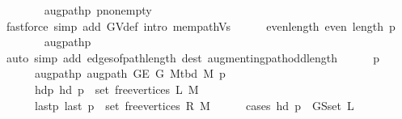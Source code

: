 \begin{isabellebody}
\ \ \ \ \ \ \isamarkupfalse%
\ augpath{\isacharunderscore}{\kern0pt}p\ p{\isacharunderscore}{\kern0pt}non{\isacharunderscore}{\kern0pt}empty\isanewline
\ \ \ \ \ \ \isamarkupfalse%
\ {\isacharparenleft}{\kern0pt}fastforce\ simp\ add{\isacharcolon}{\kern0pt}\ G{\isachardot}{\kern0pt}V{\isacharunderscore}{\kern0pt}def\ intro{\isacharcolon}{\kern0pt}\ mem{\isacharunderscore}{\kern0pt}path{\isacharunderscore}{\kern0pt}Vs{\isacharparenright}{\kern0pt}{\isacharplus}{\kern0pt}\isanewline
\ \ \ \ \isamarkupfalse%
\ even{\isacharunderscore}{\kern0pt}length{\isacharcolon}{\kern0pt}\ {\isachardoublequoteopen}even\ {\isacharparenleft}{\kern0pt}length\ p{\isacharparenright}{\kern0pt}{\isachardoublequoteclose}\isanewline
\ \ \ \ \ \ \isamarkupfalse%
\ augpath{\isacharunderscore}{\kern0pt}p\isanewline
\ \ \ \ \ \ \isamarkupfalse%
\ {\isacharparenleft}{\kern0pt}auto\ simp\ add{\isacharcolon}{\kern0pt}\ edges{\isacharunderscore}{\kern0pt}of{\isacharunderscore}{\kern0pt}path{\isacharunderscore}{\kern0pt}length\ dest{\isacharcolon}{\kern0pt}\ augmenting{\isacharunderscore}{\kern0pt}path{\isacharunderscore}{\kern0pt}odd{\isacharunderscore}{\kern0pt}length{\isacharparenright}{\kern0pt}\isanewline
\ \ \ \ \isamarkupfalse%
\ p{\isacharprime}{\kern0pt}\ \isanewline
\ \ \ \ \ \ augpath{\isacharunderscore}{\kern0pt}p{\isacharprime}{\kern0pt}{\isacharcolon}{\kern0pt}\ {\isachardoublequoteopen}augpath\ {\isacharparenleft}{\kern0pt}G{\isachardot}{\kern0pt}E\ G{\isacharparenright}{\kern0pt}\ {\isacharparenleft}{\kern0pt}M{\isacharunderscore}{\kern0pt}tbd\ M{\isacharparenright}{\kern0pt}\ p{\isacharprime}{\kern0pt}{\isachardoublequoteclose}\ \isanewline
\ \ \ \ \ \ hd{\isacharunderscore}{\kern0pt}p{\isacharprime}{\kern0pt}{\isacharcolon}{\kern0pt}\ {\isachardoublequoteopen}hd\ p{\isacharprime}{\kern0pt}\ {\isasymin}\ set\ {\isacharparenleft}{\kern0pt}free{\isacharunderscore}{\kern0pt}vertices\ L\ M{\isacharparenright}{\kern0pt}{\isachardoublequoteclose}\ \isanewline
\ \ \ \ \ \ last{\isacharunderscore}{\kern0pt}p{\isacharprime}{\kern0pt}{\isacharcolon}{\kern0pt}\ {\isachardoublequoteopen}last\ p{\isacharprime}{\kern0pt}\ {\isasymin}\ set\ {\isacharparenleft}{\kern0pt}free{\isacharunderscore}{\kern0pt}vertices\ R\ M{\isacharparenright}{\kern0pt}{\isachardoublequoteclose}\isanewline
\ \ \ \ \isamarkupfalse%
\ {\isacharparenleft}{\kern0pt}cases\ {\isachardoublequoteopen}hd\ p\ {\isasymin}\ G{\isachardot}{\kern0pt}S{\isachardot}{\kern0pt}set\ L{\isachardoublequoteclose}{\isacharparenright}{\kern0pt}\isanewline

\end{isabellebody}
